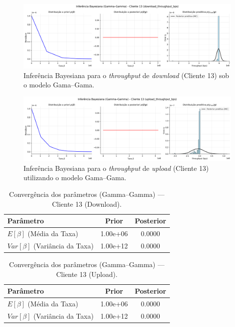 \documentclass{article}
\begin{document}
\begin{figure}[H]
	\centering
	\includegraphics[width=\textwidth]{../figures/bayes/download_throughput_bps_bayesian_gammagamma_client13.png}
	\caption{Inferência Bayesiana para o \textit{throughput} de \textit{download} (Cliente 13) sob o modelo Gama–Gama.}
	\label{fig:download_throughput_bps_bayesian_gammagamma_client13}
\end{figure}
\begin{figure}[H]
	\centering
	\includegraphics[width=\textwidth]{../figures/bayes/upload_throughput_bps_bayesian_gammagamma_client13.png}
	\caption{Inferência Bayesiana para o \textit{throughput} de \textit{upload} (Cliente 13) utilizando o modelo Gama–Gama.}
	\label{fig:upload_throughput_bps_bayesian_gammagamma_client13}
\end{figure}

\begin{table}[H]
	\centering
	\caption{Convergência dos parâmetros (Gamma–Gamma) — Cliente 13 (Download).}
	\label{tab:bayes_gamma_download_client13}
	\begin{tabular}{lcc}
		\hline
		\textbf{Parâmetro} & \textbf{Prior} & \textbf{Posterior} \\ \hline
		$E[\beta]$ (Média da Taxa) & 1.00e+06 & 0.0000 \\
		$Var[\beta]$ (Variância da Taxa) & 1.00e+12 & 0.0000 \\ \hline
	\end{tabular}
\end{table}

\begin{table}[H]
	\centering
	\caption{Convergência dos parâmetros (Gamma–Gamma) — Cliente 13 (Upload).}
	\label{tab:bayes_gamma_upload_client13}
	\begin{tabular}{lcc}
		\hline
		\textbf{Parâmetro} & \textbf{Prior} & \textbf{Posterior} \\ \hline
		$E[\beta]$ (Média da Taxa) & 1.00e+06 & 0.0000 \\
		$Var[\beta]$ (Variância da Taxa) & 1.00e+12 & 0.0000 \\ \hline
	\end{tabular}
\end{table}
\end{document}

